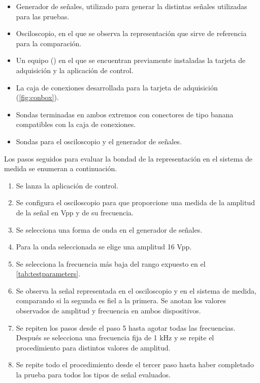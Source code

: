 \begin{itemize}
    \item Generador de señales, utilizado para generar la distintas señales
	utilizadas para las pruebas.
    \item Osciloscopio, en el que se observa la representación que sirve de
	referencia para la comparación.
    \item Un equipo (\pc{}) en el que se encuentran previamente instaladas
	la tarjeta de adquisición y la aplicación de control.
    \item La caja de conexiones desarrollada para la tarjeta de
	adquisición (\vref{fig:conbox}).
    \item Sondas terminadas en ambos extremos con conectores de tipo banana
	compatibles con la caja de conexiones.
    \item Sondas para el osciloscopio y el generador de señales.
\end{itemize}

Los pasos seguidos para evaluar la bondad de la representación en el
sistema de medida se enumeran a continuación.

\begin{enumerate}
    \item Se lanza la aplicación de control.
    \item Se configura el osciloscopio para que proporcione una medida de
	la amplitud de la señal en Vpp y de su frecuencia.
    \item Se selecciona una forma de onda en el generador de señales.
    \item Para la onda seleccionada se elige una amplitud 16 Vpp.
    \item Se selecciona la frecuencia más baja del rango expuesto en el
	\cref{tab:testparameters}.
    \item Se observa la señal representada en el osciloscopio y en el
	sistema de medida, comparando si la segunda es fiel a la primera.
	Se anotan los valores observados de amplitud y frecuencia en ambos
	dispositivos.
    \item Se repiten los pasos desde el paso 5 hasta agotar todas las
	frecuencias. Después se selecciona una frecuencia fija de 1 kHz y
	se repite el procedimiento para distintos valores de amplitud.
    \item Se repite todo el procedimiento desde el tercer paso hasta haber
	completado la prueba para todos los tipos de señal evaluados.
\end{enumerate}

